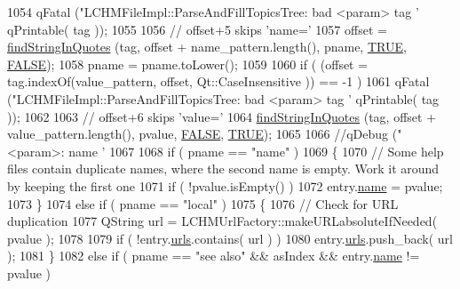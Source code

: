\begin{DoxyCode}
{{{1054                 qFatal (\textcolor{stringliteral}{"LCHMFileImpl::ParseAndFillTopicsTree: bad <param> tag '%
      qPrintable( tag ));
1055 
1056             \textcolor{comment}{// offset+5 skips 'name='}
1057             offset = \hyperlink{classLCHMFileImpl_a4682910033121f594c7619b92a55af54}{findStringInQuotes} (tag, offset + name\_pattern.length(), pname, 
      \hyperlink{unpluckint_8h_aa8cecfc5c5c054d2875c03e77b7be15d}{TRUE}, \hyperlink{unpluckint_8h_aa93f0eb578d23995850d61f7d61c55c1}{FALSE});
1058             pname = pname.toLower();
1059 
1060             \textcolor{keywordflow}{if} ( (offset = tag.indexOf(value\_pattern, offset, Qt::CaseInsensitive )) == -1 )
1061                 qFatal (\textcolor{stringliteral}{"LCHMFileImpl::ParseAndFillTopicsTree: bad <param> tag '%
      qPrintable( tag ));
1062 
1063             \textcolor{comment}{// offset+6 skips 'value='}
1064             \hyperlink{classLCHMFileImpl_a4682910033121f594c7619b92a55af54}{findStringInQuotes} (tag, offset + value\_pattern.length(), pvalue, 
      \hyperlink{unpluckint_8h_aa93f0eb578d23995850d61f7d61c55c1}{FALSE}, \hyperlink{unpluckint_8h_aa8cecfc5c5c054d2875c03e77b7be15d}{TRUE});
1065 
1066             \textcolor{comment}{//qDebug ("<param>: name '%
1067 
1068             \textcolor{keywordflow}{if} ( pname == \textcolor{stringliteral}{"name"} )
1069             \{
1070                 \textcolor{comment}{// Some help files contain duplicate names, where the second name is empty. Work it around
       by keeping the first one}
1071                 \textcolor{keywordflow}{if} ( !pvalue.isEmpty() )
1072                     entry.\hyperlink{structLCHMParsedEntry_a90196da32bb2ed757f516caf583a6437}{name} = pvalue;
1073             \}
1074             \textcolor{keywordflow}{else} \textcolor{keywordflow}{if} ( pname == \textcolor{stringliteral}{"local"} )
1075             \{
1076                 \textcolor{comment}{// Check for URL duplication}
1077                 QString url = LCHMUrlFactory::makeURLabsoluteIfNeeded( pvalue );
1078                 
1079                 \textcolor{keywordflow}{if} ( !entry.\hyperlink{structLCHMParsedEntry_aa871a08e7fca4ae8e23983ff299bd24f}{urls}.contains( url ) )
1080                     entry.\hyperlink{structLCHMParsedEntry_aa871a08e7fca4ae8e23983ff299bd24f}{urls}.push\_back( url );
1081             \}
1082             \textcolor{keywordflow}{else} \textcolor{keywordflow}{if} ( pname == \textcolor{stringliteral}{"see also"} && asIndex && entry.\hyperlink{structLCHMParsedEntry_a90196da32bb2ed757f516caf583a6437}{name} != pvalue )
}}}}}}
\end{DoxyCode}
